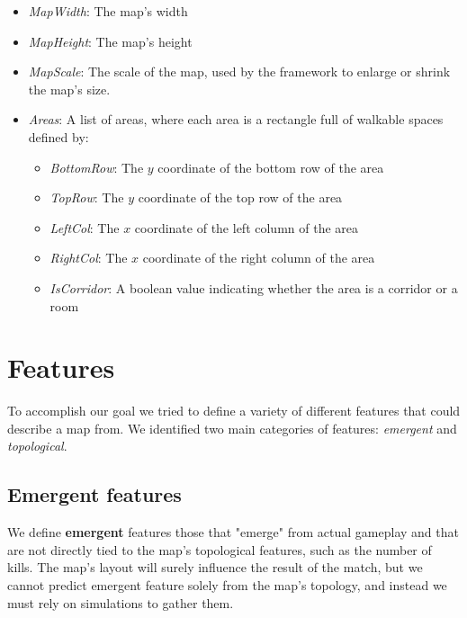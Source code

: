 \documentclass{Configuration_Files/PoliMi3i_thesis}
\begin{document}
\begin{itemize}
    \item \textit{MapWidth}: The map's width
    \item \textit{MapHeight}: The map's height
    \item \textit{MapScale}: The scale of the map, used by the framework to enlarge or shrink the map's size.
    \item \textit{Areas}: A list of areas, where each area is a rectangle full of walkable spaces defined by:
    \begin{itemize}
        \item \textit{BottomRow}: The $y$ coordinate of the bottom row of the area
        \item \textit{TopRow}: The $y$ coordinate of the top row of the area
        \item \textit{LeftCol}: The $x$ coordinate of the left column of the area
        \item \textit{RightCol}: The $x$ coordinate of the right column of the area
        \item \textit{IsCorridor}: A boolean value indicating whether the area is a corridor or a room
    \end{itemize}
\end{itemize}

\section{Features}
\label{sec:features}
To accomplish our goal we tried to define a variety of different features that could describe a map from. We identified two main categories of features:  \textit{emergent} and \textit{topological}.

\subsection{Emergent features}
\label{subsec:emergent_features}
We define \textbf{emergent} features those that "emerge" from actual gameplay and that are not directly tied to the map's topological features, such as the number of kills. The map's layout will surely influence the result of the match, but we cannot predict emergent feature solely from the map's topology, and instead we must rely on simulations to gather them.
\end{document}
